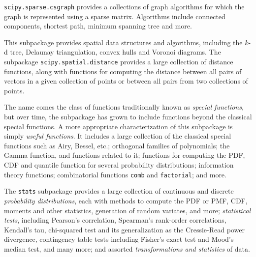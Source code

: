 \begin{description}[leftmargin=!, labelwidth=\widthof{\bfseries \texttt{interpolate}}]
    \texttt{scipy.sparse.csgraph} provides a collections of graph algorithms
    for which the graph is represented using a sparse matrix.  Algorithms
    include connected components, shortest path, minimum spanning tree
    and more.
\item[\texttt{spatial}]
    This subpackage provides spatial data structures and algorithms,
    including the $k$-d tree, Delaunay triangulation, convex hulls and Voronoi
    diagrams.  The subpackage \texttt{scipy.spatial.distance} provides
    a large collection of distance functions, along with functions for
    computing the distance between all pairs of vectors in a given collection
    of points or between all pairs from two collections of points.
\item[\texttt{special}]
    The name comes the class of functions traditionally known as \emph{special
    functions}, but over time, the subpackage has grown to include functions
    beyond the classical special functions.  A more appropriate characterization
    of this subpackage is simply \emph{useful functions}.
    It includes a large collection of the classical special functions
    such as Airy, Bessel, etc.; orthogonal families of polynomials;
    the Gamma function, and functions related to it;
    functions for computing the PDF, CDF and quantile function for several
    probability distributions;
    information theory functions;
    combinatorial functions \texttt{comb} and \texttt{factorial};
    and more.
\item[\texttt{stats}]
    The \texttt{stats} subpackage provides a large collection of continuous
    and discrete \emph{probability distributions}, each with methods to compute
    the PDF or PMF, CDF, moments and other statistics, generation of random
    variates, and more;
    \emph{statistical tests}, including Pearson's correlation, Spearman's rank-order
    correlations, Kendall's tau, chi-squared test and its generalization as the
    Cressie-Read power divergence, contingency table tests including Fisher's
    exact test and Mood's median test, and many more;
    and assorted \emph{transformations and statistics} of data.
\end{description}
